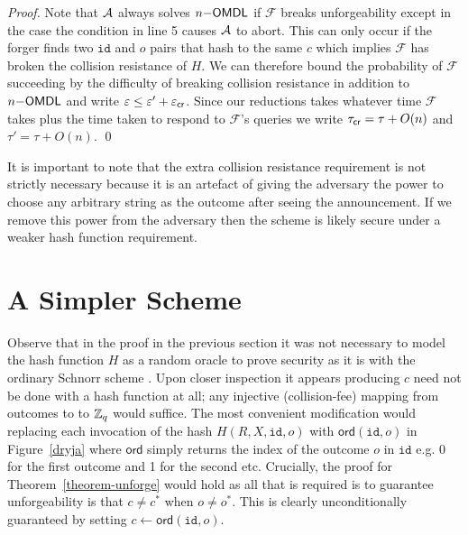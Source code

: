 \documentclass[runningheads]{llncs}
\newcommand{\eventid}{\mathtt{id}}
\newcommand{\F}{\mathcal{F}}
\begin{document}
\begin{proof}
    Note that $\mathcal{A}$ always solves $n\mathsf{-OMDL}$ if $\F$ breaks unforgeability except in the case the condition in line 5 causes $\mathcal{A}$ to abort.
    This can only occur if the forger finds two $\eventid$ and $o$ pairs that hash to the same $c$ which implies $\F$ has broken the collision resistance of $H$.
    We can therefore bound the probability of $\F$ succeeding by the difficulty of breaking collision resistance in addition to $n\mathsf{-OMDL}$ and write $\varepsilon \leq \varepsilon' + \varepsilon_{\mathsf{cr}}$.
    Since our reductions takes whatever time $\F$ takes plus the time taken to respond to $\F$'s queries we write $\tau_{\mathsf{cr}} = \tau + O(n)$ and $\tau' = \tau + O(n)$.
\qed
\end{proof}

It is important to note that the extra collision resistance requirement is not strictly necessary because it is an artefact of giving the adversary the power to choose any arbitrary string as the outcome after seeing the announcement.
If we remove this power from the adversary then the scheme is likely secure under a weaker hash function requirement.


\section{A Simpler Scheme}
\label{simple}
\newcommand{\ord}{\mathsf{ord}}

Observe that in the proof in the previous section it was not necessary to model the hash function $H$ as a random oracle to prove security as it is with the ordinary Schnorr scheme \cite{pointcheval2000security}.
Upon closer inspection it appears producing $c$ need not be done with a hash function at all; any injective (collision-fee) mapping from outcomes to to $\mathbb{Z}_q$ would suffice.
The most convenient modification would replacing each invocation of the hash $H(R, X, \eventid, o)$  with $\ord(\eventid,o)$ in Figure~\ref{dryja} where $\ord$ simply returns the index of the outcome $o$ in $\eventid$ e.g. 0 for the first outcome and 1 for the second etc.
Crucially, the proof for Theorem~\ref{theorem-unforge} would hold as all that is required is to guarantee unforgeability is that $c \neq c^*$ when $o \neq o^{*}$.
This is clearly unconditionally guaranteed by setting $c \gets \ord(\eventid, o)$.
\end{document}
